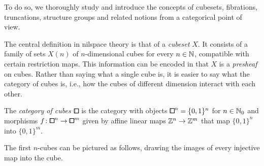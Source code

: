 To do so, we thoroughly study and introduce the concepts of cubesets, fibrations, truncations, structure groups and related notions
from a categorical point of view.

The central definition in nilspace theory is that of a \emph{cubeset} $X$.
It consists of a family of sets $X(n)$ of $n$-dimensional cubes for every $n\in{\mathbb{N}}$,
compatible with certain restriction maps.
This information can be encoded in that $X$ is a \emph{presheaf} on cubes.
Rather than saying what a single cube is, it is easier to say what the category of cubes is,
i.e., how the cubes of different dimension interact with each other.

\begin{definition*}
The \emph{category of cubes $\bbox$} is the category with objects ${\bbox}^n = \{0,1\}^n$ for $n\in{\mathbb{N}}_0$
and morphisms $f\colon{\bbox}^n\to{\bbox}^m$ given by affine linear maps $\mathbb{Z}^n\to\mathbb{Z}^m$ that map $\{0,1\}^n$ into $\{0,1\}^m$.
\end{definition*}

The first $n$-cubes can be pictured as follows, drawing the images of every injective map into the cube.

